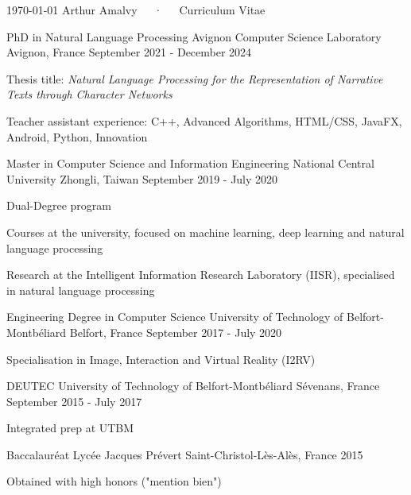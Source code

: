 \documentclass[11pt, a4paper]{awesome-cv}
\begin{document}
\makecvheader

\makecvfooter
  {\today}
  {Arthur Amalvy~~~·~~~Curriculum Vitae}
  {\thepage}



\begin{cventries}

  \cventry
  {PhD in Natural Language Processing}
  {Avignon Computer Science Laboratory}
  {Avignon, France}
  {September 2021 - December 2024}
  {
    \begin{cvitems}
      \item Thesis title: \textit{Natural Language Processing for the Representation of Narrative Texts through Character Networks}
      \item Teacher assistant experience: C++, Advanced Algorithms, HTML/CSS, JavaFX, Android, Python, Innovation
    \end{cvitems}
  }

  \cventry
  {Master in Computer Science and Information Engineering} %
  {National Central University} %
  {Zhongli, Taiwan} %
  {September 2019 - July 2020} %
  {
    \begin{cvitems} %
      \item Dual-Degree program
      \item Courses at the university, focused on machine learning, deep learning and natural language processing
      \item Research at the Intelligent Information Research Laboratory (IISR), specialised in natural language processing
    \end{cvitems}
  }

  \cventry
  {Engineering Degree in Computer Science}
  {University of Technology of Belfort-Montbéliard}
  {Belfort, France}
  {September 2017 - July 2020}
  {
    \begin{cvitems}
      \item Specialisation in Image, Interaction and Virtual Reality (I2RV)
    \end{cvitems}
  }

  \cventry
  {DEUTEC}
  {University of Technology of Belfort-Montbéliard}
  {Sévenans, France}
  {September 2015 - July 2017}
  {
    \begin{cvitems}
      \item Integrated prep at UTBM
    \end{cvitems}
  }

  \cventry
  {Baccalauréat}
  {Lycée Jacques Prévert}
  {Saint-Christol-Lès-Alès, France}
  {2015}
  {
    \begin{cvitems}
      \item Obtained with high honors ("mention bien")
    \end{cvitems}
  }

\end{cventries}
\end{document}
